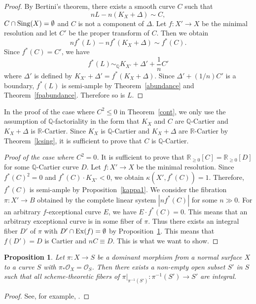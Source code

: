 \documentclass[12pt,twoside]{amsart}
\newtheorem{prop}[thm]{Proposition}
\theoremstyle{definition}
\newcommand{\Q}{$\mathbb{Q}$}
\begin{document}
\begin{proof}
By Bertini's theorem, there exists a smooth curve $C$ such that 
$$nL-n(K_X+\Delta) \sim C,$$ 
$C \cap {\rm Sing}(X)=\emptyset$ and $C$ is not a component of $\Delta$. 
Let $f:X' \to X$ be the minimal resolution and 
let $C'$ be the proper transform of $C$. 
Then we obtain 
$$nf^*(L)-nf^*(K_X+\Delta) \sim f^*(C).$$ 
Since $f^*(C)=C'$, we have 
$$f^*(L)\sim_{\mathbb{Q}} K_{X'}+\Delta'+\frac{1}{n}C'$$
where $\Delta'$ is defined by $K_{X'}+\Delta'=f^*(K_X+\Delta)$. 
Since $\Delta'+(1/n)C'$ is a boundary, 
$f^*(L)$ is semi-ample
by Theorem~\ref{abundance} and Theorem~\ref{fpabundance}. 
Therefore so is $L$.
\end{proof}

In the proof of the case where $C^2\leq 0$ in Theorem~\ref{cont}, 
we only use the assumption of \Q-factoriality in the form that 
$K_X$ and $C$ are \Q-Cartier and 
$K_X+\Delta$ is $\mathbb{R}$-Cartier. 
Since $K_X$ is \Q-Cartier and 
$K_X+\Delta$ are $\mathbb{R}$-Cartier by Theorem~\ref{lcsing}, 
it is sufficient to prove that $C$ is \Q-Cartier.


\begin{proof}[Proof of the case where $C^2=0$]
It is sufficient to prove that 
$\mathbb{R}_{\geq 0}[C]=\mathbb{R}_{\geq 0}[D]$ 
for some \Q-Cartier curve $D$. 
Let $f:X' \to X$ be the minimal resolution. 
Since $f^*(C)^2=0$ and $f^*(C)\cdot K_{X'}<0$, 
we obtain $\kappa(X', f^*(C))=1$. 
Therefore, $f^*(C)$ is semi-ample by Proposition~\ref{kappa1}. 
We consider the fibration $\pi:X' \to B$ obtained by 
the complete linear system $|nf^*(C)|$ for some $n\gg 0$. 
For an arbitrary $f$-exceptional curve $E$, we have $E\cdot f^*(C)=0$. 
This means that an arbitrary exceptional curve is in some fiber of $\pi$. 
Thus there exists an integral fiber $D'$ of $\pi$ 
with $D' \cap {\rm Ex}(f)=\emptyset$
by Proposition~\ref{genericintegral}. 
This means that $f(D')=D$ is Cartier and $nC \equiv D$. 
This is what we want to show.
\end{proof}

\begin{prop}\label{genericintegral}
Let $\pi: X \to S$ be a dominant morphism 
from a normal surface $X$ to a curve $S$ 
with $\pi_*\mathcal{O}_X=\mathcal{O}_S$. 
Then there exists a non-empty open subset $S'$ in $S$ such that 
all scheme-theoretic fibers of 
$\pi|_{\pi^{-1}(S')}:\pi^{-1}(S') \to S'$ are integral. 
\end{prop}

\begin{proof}
See, for example, \cite[Cororally~7.3]{Badescu}.
\end{proof}
\end{document}
